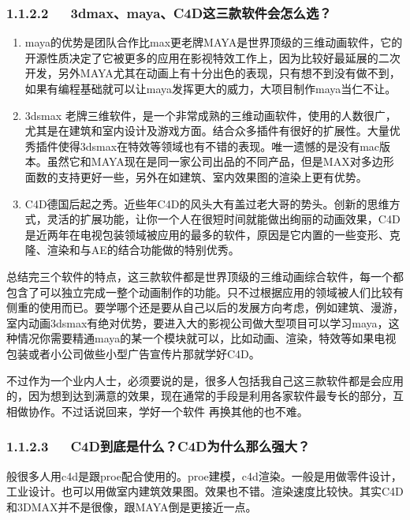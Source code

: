 \documentclass[letterpaper,12pt,english]{sphinxmanual}
\begin{document}
\subsubsection{1.1.2.2   3dmax、maya、C4D这三款软件会怎么选？}
\label{\detokenize{000misc/extract:dmaxmayac4d}}
\begin{enumerate}
%
\item {} 
maya的优势是团队合作比max更老牌MAYA是世界顶级的三维动画软件，它的开源性质决定了它被更多的应用在影视特效工作上，因为比较好最延展的二次开发，另外MAYA尤其在动画上有十分出色的表现，只有想不到没有做不到，如果有编程基础就可以让maya发挥更大的威力，大项目制作maya当仁不让。

\item {} 
3dsmax 老牌三维软件，是一个非常成熟的三维动画软件，使用的人数很广，尤其是在建筑和室内设计及游戏方面。结合众多插件有很好的扩展性。大量优秀插件使得3dsmax在特效等领域也有不错的表现。唯一遗憾的是没有mac版本。虽然它和MAYA现在是同一家公司出品的不同产品，但是MAX对多边形面数的支持更好一些，另外在如建筑、室内效果图的渲染上更有优势。

\item {} 
C4D德国后起之秀。近些年C4D的风头大有盖过老大哥的势头。创新的思维方式，灵活的扩展功能，让你一个人在很短时间就能做出绚丽的动画效果，C4D是近两年在电视包装领域被应用的最多的软件，原因是它内置的一些变形、克隆、渲染和与AE的结合功能做的特别优秀。

\end{enumerate}

总结完三个软件的特点，这三款软件都是世界顶级的三维动画综合软件，每一个都包含了可以独立完成一整个动画制作的功能。只不过根据应用的领域被人们比较有侧重的使用而已。要学哪个还是要从自己以后的发展方向考虑，例如建筑、漫游，室内动画3dsmax有绝对优势，要进入大的影视公司做大型项目可以学习maya，这种情况你需要精通maya的某一个模块就可以，比如动画、渲染，特效等如果电视包装或者小公司做些小型广告宣传片那就学好C4D。

不过作为一个业内人士，必须要说的是，很多人包括我自己这三款软件都是会应用的，因为想到达到满意的效果，现在通常的手段是利用各家软件最专长的部分，互相做协作。不过话说回来，学好一个软件 再换其他的也不难。


\subsubsection{1.1.2.3   C4D到底是什么？C4D为什么那么强大？}
\label{\detokenize{000misc/extract:c4d-c4d}}
般很多人用c4d是跟proe配合使用的。proe建模，c4d渲染。一般是用做零件设计，工业设计。也可以用做室内建筑效果图。效果也不错。渲染速度比较快。其实C4D和3DMAX并不是很像，跟MAYA倒是更接近一点。
\end{document}

